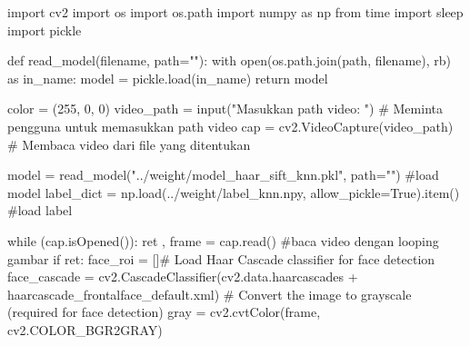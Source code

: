 \documentclass[
  letterpaper,
  DIV=11,
  numbers=noendperiod]{scrreprt}
\newenvironment{Shaded}{\begin{snugshade}}{\end{snugshade}}
\newcommand{\BuiltInTok}[1]{\textcolor[rgb]{0.00,0.23,0.31}{#1}}
\newcommand{\CommentTok}[1]{\textcolor[rgb]{0.37,0.37,0.37}{#1}}
\newcommand{\ControlFlowTok}[1]{\textcolor[rgb]{0.00,0.23,0.31}{#1}}
\newcommand{\DecValTok}[1]{\textcolor[rgb]{0.68,0.00,0.00}{#1}}
\newcommand{\ImportTok}[1]{\textcolor[rgb]{0.00,0.46,0.62}{#1}}
\newcommand{\KeywordTok}[1]{\textcolor[rgb]{0.00,0.23,0.31}{#1}}
\newcommand{\NormalTok}[1]{\textcolor[rgb]{0.00,0.23,0.31}{#1}}
\newcommand{\OperatorTok}[1]{\textcolor[rgb]{0.37,0.37,0.37}{#1}}
\newcommand{\StringTok}[1]{\textcolor[rgb]{0.13,0.47,0.30}{#1}}
\newcommand{\VariableTok}[1]{\textcolor[rgb]{0.07,0.07,0.07}{#1}}
\begin{document}
\begin{Shaded}
\begin{Highlighting}[]
\ImportTok{import}\NormalTok{ cv2}
\ImportTok{import}\NormalTok{ os}
\ImportTok{import}\NormalTok{ os.path}
\ImportTok{import}\NormalTok{ numpy }\ImportTok{as}\NormalTok{ np}
\ImportTok{from}\NormalTok{ time }\ImportTok{import}\NormalTok{ sleep}
\ImportTok{import}\NormalTok{ pickle}

\KeywordTok{def}\NormalTok{ read\_model(filename, path}\OperatorTok{=}\StringTok{""}\NormalTok{):}
    \ControlFlowTok{with} \BuiltInTok{open}\NormalTok{(os.path.join(path, filename), }\StringTok{\textquotesingle{}rb\textquotesingle{}}\NormalTok{) }\ImportTok{as}\NormalTok{ in\_name:}
\NormalTok{        model }\OperatorTok{=}\NormalTok{ pickle.load(in\_name)}
        \ControlFlowTok{return}\NormalTok{ model}
    

\NormalTok{color }\OperatorTok{=}\NormalTok{ (}\DecValTok{255}\NormalTok{, }\DecValTok{0}\NormalTok{, }\DecValTok{0}\NormalTok{)}
\NormalTok{video\_path }\OperatorTok{=} \BuiltInTok{input}\NormalTok{(}\StringTok{"Masukkan path video: "}\NormalTok{)  }\CommentTok{\# Meminta pengguna untuk memasukkan path video}
\NormalTok{cap }\OperatorTok{=}\NormalTok{ cv2.VideoCapture(video\_path)  }\CommentTok{\# Membaca video dari file yang ditentukan}

\NormalTok{model }\OperatorTok{=}\NormalTok{ read\_model(}\StringTok{"../weight/model\_haar\_sift\_knn.pkl"}\NormalTok{, path}\OperatorTok{=}\StringTok{""}\NormalTok{) }\CommentTok{\#load model}
\NormalTok{label\_dict }\OperatorTok{=}\NormalTok{ np.load(}\StringTok{\textquotesingle{}../weight/label\_knn.npy\textquotesingle{}}\NormalTok{, allow\_pickle}\OperatorTok{=}\VariableTok{True}\NormalTok{).item() }\CommentTok{\#load label}


\ControlFlowTok{while}\NormalTok{ (cap.isOpened()):}
\NormalTok{    ret , frame }\OperatorTok{=}\NormalTok{ cap.read() }\CommentTok{\#baca video dengan looping gambar}
    \ControlFlowTok{if}\NormalTok{ ret:}
\NormalTok{        face\_roi }\OperatorTok{=}\NormalTok{ []}\CommentTok{\# Load Haar Cascade classifier for face detection}
\NormalTok{        face\_cascade }\OperatorTok{=}\NormalTok{ cv2.CascadeClassifier(cv2.data.haarcascades }\OperatorTok{+} \StringTok{\textquotesingle{}haarcascade\_frontalface\_default.xml\textquotesingle{}}\NormalTok{)}
        \CommentTok{\# Convert the image to grayscale (required for face detection)}
\NormalTok{        gray }\OperatorTok{=}\NormalTok{ cv2.cvtColor(frame, cv2.COLOR\_BGR2GRAY)}


\end{Highlighting}
\end{Shaded}
\end{document}
